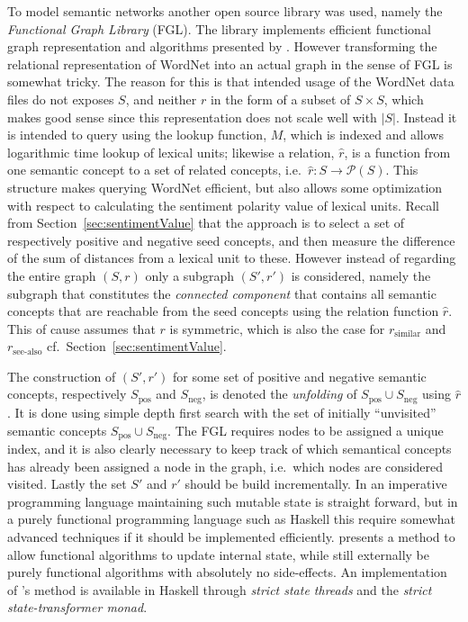 To model semantic networks another open source library was used, namely the \emph{Functional Graph Library} (FGL). The library implements efficient functional graph representation and algorithms presented by \citeauthor{fgl} . However transforming the relational representation of WordNet into an actual graph in the sense of FGL is somewhat tricky. The reason for this is that intended usage of the WordNet data files do not exposes $S$, and neither $r$ in the form of a subset of $S \times S$, which makes good sense since this representation does not scale well with $|S|$. Instead it is intended to query using the lookup function, $M$, which is indexed and allows logarithmic time lookup of lexical units; likewise a relation, $\hat{r}$, is a function from one semantic concept to a set of related concepts, i.e.\ $\hat{r}: S \to \mathcal{P}(S)$. This structure makes querying WordNet efficient, but also allows some optimization with respect to calculating the sentiment polarity value of lexical units. Recall from Section~\ref{sec:sentimentValue} that the approach is to select a set of respectively positive and negative seed concepts, and then measure the difference of the sum of distances from a lexical unit to these. However instead of regarding the entire graph $(S, r)$ only a subgraph $(S', r')$ is considered, namely the subgraph that constitutes the \emph{connected component} that contains all semantic concepts that are reachable from the seed concepts using the relation function $\hat{r}$. This of cause assumes that $r$ is symmetric, which is also the case for $r_\mathrm{similar}$ and $r_\mathrm{see\text{-}also}$ cf.\ Section~\ref{sec:sentimentValue}.

The construction of $(S', r')$ for some set of positive and negative semantic concepts, respectively $S_\mathrm{pos}$ and $S_\mathrm{neg}$, is denoted the \emph{unfolding} of $S_\mathrm{pos} \cup S_\mathrm{neg}$ using $\hat{r}$. It is done using simple depth first search with the set of initially ``unvisited'' semantic concepts $S_\mathrm{pos} \cup S_\mathrm{neg}$. The FGL requires nodes to be assigned a unique index, and it is also clearly necessary to keep track of which semantical concepts has already been assigned a node in the graph, i.e.\ which nodes are considered visited. Lastly the set $S'$ and $r'$ should be build incrementally. In an imperative programming language maintaining such mutable state is straight forward, but in a purely functional programming language such as Haskell this require somewhat advanced techniques if it should be implemented efficiently. \citeauthor{st}  presents a method to allow functional algorithms to update internal state, while still externally be purely functional algorithms with absolutely no side-effects. An implementation of \citeauthor{st}'s method is available in Haskell through \emph{strict state threads} and the \emph{strict state-transformer monad}. 

